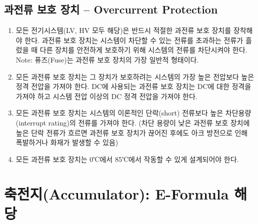 \documentclass[final,a4paper,10pt]{report}
\begin{document}
\section{과전류 보호 장치 – Overcurrent Protection}\label{rule:formula-technical.overcurrent-protection}
\begin{enumerate}
  \item\label{rule:formula-technical.overcurrent-protection.mandatory-lv-and-hv} 모든 전기시스템(LV, HV 모두 해당)은 반드시 적절한 과전류 보호 장치를 장착해야 한다. 과전류 보호 장치는 시스템이 차단할 수 있는 전류를 초과하는 전류가 흘렀을 때 다른 장치를 안전하게 보호하기 위해 시스템의 전류를 차단시켜야 한다.\\
    Note: 퓨즈(Fuse)는 과전류 보호 장치의 가장 일반적 형태이다.
  \item\label{rule:formula-technical.overcurrent-protection.rating-above-system-max} 모든 과전류 보호 장치는 그 장치가 보호하려는 시스템의 가장 높은 전압보다 높은 정격 전압을 가져야 한다. DC에 사용되는 과전류 보호 장치는 DC에 대한 정격을 가져야 하고 시스템 전압 이상의 DC 정격 전압을 가져야 한다.
  \item\label{rule:formula-technical.overcurrent-protection.rating-above-short-circuit} 모든 과전류 보호 장치는 시스템의 이론적인 단락(short) 전류보다 높은 차단용량(interrupt rating)의 전류를 가져야 한다. (차단 용량이 낮은 과전류 보호 장치에 높은 단락 전류가 흐르면 과전류 보호 장치가 끊어진 후에도 아크 방전으로 인해 폭발하거나 화재가 발생할 수 있음)
  \item\label{rule:formula-technical.overcurrent-protection.operating-range-0to85c} {\color{blue}모든 과전류 보호 장치는 0℃에서 85℃에서 작동할 수 있게 설계되어야 한다.}
\end{enumerate}

\chapter{축전지(Accumulator): E-Formula 해당}
\end{document}
